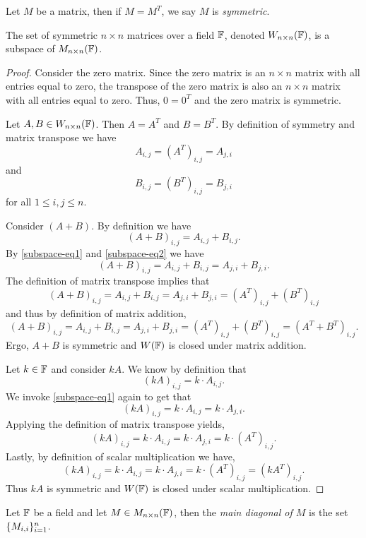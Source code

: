 \begin{definition}
	Let $M$ be a matrix, then if $M=M^T$, we say $M$ is \textit{symmetric}.
\end{definition}

\begin{example}
	The set of symmetric $n\times n$ matrices over a field $\mathbb{F}$, denoted $W_{n\times n}(\mathbb{F})$, is a subspace of $M_{n\times n}(\mathbb{F})$.
\end{example}
\begin{proof}
	Consider the zero matrix.
	Since the zero matrix is an $n\times n$ matrix with all entries equal to zero, the transpose of the zero matrix is also an $n\times n$ matrix with all entries equal to zero.
	Thus, $0=0^T$ and the zero matrix is symmetric.

	Let $A,B\in W_{n\times n}(\mathbb{F})$.
	Then $A=A^T$ and $B=B^T$.
	By definition of symmetry and matrix transpose we have
	\begin{equation}\label{subspace-eq1}
		A_{i,j}=(A^T)_{i,j}=A_{j,i}
	\end{equation}
	and
	\begin{equation}\label{subspace-eq2}
		B_{i,j}=(B^T)_{i,j}=B_{j,i}
	\end{equation}
	for all $1\leq i, j\leq n$.

	Consider $(A+B)$.
	By definition we have
	\[
		(A+B)_{i,j}=A_{i,j}+B_{i,j}.
	\]
	By \autoref{subspace-eq1} and \autoref{subspace-eq2} we have
	\[
		(A+B)_{i,j}=A_{i,j}+B_{i,j}=A_{j,i}+B_{j,i}.
	\]
	The definition of matrix transpose implies that
	\[
		(A+B)_{i,j}=A_{i,j}+B_{i,j}=A_{j,i}+B_{j,i}=(A^T)_{i,j}+(B^T)_{i,j}
	\]
	and thus by definition of matrix addition,
	\[
		(A+B)_{i,j}=A_{i,j}+B_{i,j}=A_{j,i}+B_{j,i}=(A^T)_{i,j}+(B^T)_{i,j}=(A^T+B^T)_{i,j}.
	\]
	Ergo, $A+B$ is symmetric and $W(\mathbb{F})$ is closed under matrix addition.

	Let $k\in\mathbb{F}$ and consider $kA$.
	We know by definition that
	\[
		(kA)_{i,j}=k\cdot A_{i,j}.
	\]
	We invoke \autoref{subspace-eq1} again to get that
	\[
		(kA)_{i,j}=k\cdot A_{i,j}=k\cdot A_{j,i}.
	\]
	Applying the definition of matrix transpose yields,
	\[
		(kA)_{i,j}=k\cdot A_{i,j}=k\cdot A_{j,i}=k\cdot (A^T)_{i,j}.
	\]
	Lastly, by definition of scalar multiplication we have,
	\[
		(kA)_{i,j}=k\cdot A_{i,j}=k\cdot A_{j,i}=k\cdot (A^T)_{i,j}=(kA^T)_{i,j}.
	\]
	Thus $kA$ is symmetric and $W(\mathbb{F})$ is closed under scalar multiplication.
\end{proof}

\begin{definition}
	Let $\mathbb{F}$ be a field and let $M\in M_{n\times n}(\mathbb{F})$, then the \textit{main diagonal of $M$} is the set $\lbrace M_{i,i} \rbrace_{i=1}^n$.
\end{definition}

